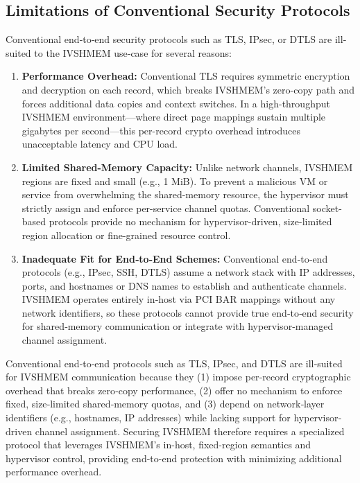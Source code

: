\documentclass[conference]{IEEEtran}
\begin{document}
\subsection{Limitations of Conventional Security Protocols}

Conventional end‐to‐end security protocols such as TLS, IPsec, or DTLS are
ill‐suited to the IVSHMEM use‐case for several reasons:

\begin{enumerate}
  \item \textbf{Performance Overhead:}
        Conventional TLS requires symmetric encryption and decryption on each record, which breaks IVSHMEM’s zero-copy path and forces additional data copies and context switches.  In a high-throughput IVSHMEM environment—where direct page mappings sustain multiple gigabytes per second—this per-record crypto overhead introduces unacceptable latency and CPU load.

  \item \textbf{Limited Shared-Memory Capacity:}
        Unlike network channels, IVSHMEM regions are fixed and small (e.g., 1 MiB). To prevent a malicious VM or service from overwhelming the shared-memory resource, the hypervisor must strictly assign and enforce per-service channel quotas. Conventional socket-based protocols provide no mechanism for hypervisor-driven, size-limited region allocation or fine-grained resource control.

  \item \textbf{Inadequate Fit for End‐to‐End Schemes:}
        Conventional end‐to‐end protocols (e.g., IPsec, SSH, DTLS) assume a network stack with IP addresses, ports, and hostnames or DNS names to establish and authenticate channels. IVSHMEM operates entirely in‐host via PCI BAR mappings without any network identifiers, so these protocols cannot provide true end‐to‐end security for shared‐memory communication or integrate with hypervisor‐managed channel assignment.

\end{enumerate}

Conventional end‐to‐end protocols such as TLS, IPsec, and DTLS are ill‐suited
for IVSHMEM communication because they (1) impose per‐record cryptographic
overhead that breaks zero‐copy performance, (2) offer no mechanism to enforce
fixed, size‐limited shared‐memory quotas, and (3) depend on network‐layer
identifiers (e.g., hostnames, IP addresses) while lacking support for
hypervisor‐driven channel assignment. Securing IVSHMEM therefore requires a
specialized protocol that leverages IVSHMEM’s in-host, fixed-region semantics
and hypervisor control, providing end-to-end protection with minimizing
additional performance overhead.
\end{document}
